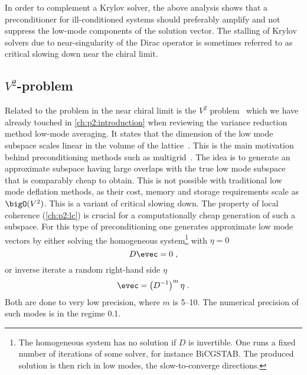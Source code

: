 
In order to complement a Krylov solver, the above analysis shows that a preconditioner for ill-conditioned systems should preferably amplify and not suppress the low-mode components of the solution vector.
The stalling of Krylov solvers due to near-singularity of the Dirac operator is sometimes referred to as critical slowing down near the chiral limit.

\subsection{\texorpdfstring{$V^{2}$}{V2}-problem}
\label{sec:mg:V2:problem}

Related to the problem in the near chiral limit is the $V^{2}$ problem~\cite{Luescher2007} which we have already touched in \cref{ch:p2:introduction} when reviewing the variance reduction method low-mode averaging.
It states that the dimension of the low mode subspace scales linear in the volume of the lattice~\cite{banks1980}.
This is the main motivation behind preconditioning methods such as multigrid~\cite{Babich:2010qb}.
The idea is to generate an approximate subspace having large overlaps with the true low mode subspace that is comparably cheap to obtain.
This is not possible with traditional low mode deflation methods, as their cost, memory and storage requirements scale as $\bigO(V^{2})$.
This is a variant of critical slowing down.
The property of local coherence (\cref{ch:p2:lc}) is crucial for a computationally cheap generation of such a subspace.
For this type of preconditioning one generates approximate low mode vectors by either solving the homogeneous system\footnote{The homogeneous system has no solution if $D$ is invertible. One runs a fixed number of iterations of some solver, for instance BiCGSTAB. The produced solution is then rich in low modes, \ie the slow-to-converge directions.} with $\eta=0$
\begin{equation}
D \evec = 0 \;,
\end{equation}{}
or inverse iterate a random right-hand side $\eta$
\begin{equation}
\evec = \left( D^{-1} \right)^{m} \eta \;.
\end{equation}
Both are done to very low precision, where $m$ is \numrange{5}{10}.
The numerical precision of such modes is in the regime \num{0.1}.

